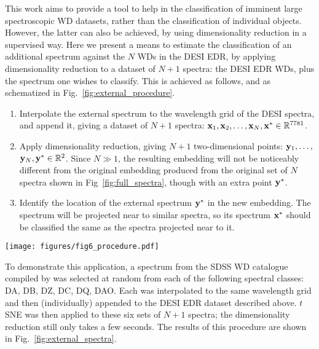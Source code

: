 \documentclass[fleqn,usenatbib]{mnras}
\def\xb{\vb{x}}
\def\yb{\vb{y}}
\begin{document}
This work aims to provide a tool to help in the classification of imminent large spectroscopic WD datasets, rather than the classification of individual objects.
However, the latter can also be achieved, by using dimensionality reduction in a supervised way.
Here we present a means to estimate the classification of an additional spectrum against the $N$ WDs in the DESI EDR, by applying dimensionality reduction to a dataset of $N+1$ spectra: the DESI EDR WDs, plus the spectrum one wishes to classify.
This is achieved as follows, and as schematized in Fig.~\ref{fig:external_procedure}.
\begin{enumerate}
\item
Interpolate the external spectrum to the wavelength grid of the DESI spectra, and append it, giving a dataset of $N+1$ spectra: $\xb_1, \xb_2, \dots, \xb_N, \xb^* \in \mathbb{R}^{7781}$.
\item
Apply dimensionality reduction, giving $N+1$ two-dimensional points: $\yb_1, \dots,$ $\yb_N, \yb^* \in \mathbb{R}^2$.
Since $N\gg1$, the resulting embedding will not be noticeably different from the original embedding produced from the original set of $N$ spectra shown in Fig~\ref{fig:full_spectra}, though with an extra point $\yb^*$.
\item
Identify the location of the external spectrum $\yb^*$ in the new embedding.
The spectrum will be projected near to similar spectra, so its spectrum $\xb^*$ should be classified the same as the spectra projected near to it.
\end{enumerate}

\begin{figure*}
\texttt{[image: figures/fig6\_procedure.pdf]}
\caption{
    Procedure for classifying external WD spectra against DESI EDR (see text).
    One would estimate the classification of this spectrum (black) as a DA.
}
\label{fig:external_procedure}
\end{figure*}

To demonstrate this application, a spectrum from the SDSS WD catalogue compiled by \citet{gentilefusillo19} was selected at random from each of the following spectral classes: DA, DB, DZ, DC, DQ, DAO.
Each was interpolated to the same wavelength grid and then (individually) appended to the DESI EDR dataset described above.
$t$SNE was then applied to these six sets of $N+1$ spectra; the dimensionality reduction still only takes a few seconds.
The results of this procedure are shown in Fig.~\ref{fig:external_spectra}.
\end{document}
